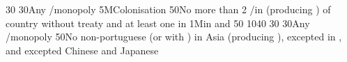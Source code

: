 {}{30}{}%
%
%
{}{30}{Any \CTZ/\STZ monopoly}%
%
\EUobjective5M{Colonisation}{}%
{}{50}{No more than 2 \COL/\TP in \continentAsia (producing \POSPICE) of
  country without treaty and at least one \COL in \continentBrazil}%
%
%
%
\EUobjective1M{\TP in \payschine and \paysjapon}{}%
{}{50}{}%
%
%
{10}{40}{}%
%
%
{}{30}{}%
%
%
{}{30}{Any \CTZ/\STZ monopoly}%
%
%
{}{50}{No non-portuguese \TP (or with \dipAT) in Asia (producing \POSPICE),
  excepted in , and excepted Chinese and Japanese
  \TP}%

